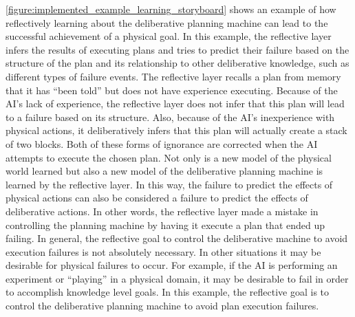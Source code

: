 {\mbox{\autoref{figure:implemented_example_learning_storyboard}}}
shows an example of how reflectively learning about the deliberative
planning machine can lead to the successful achievement of a physical
goal.  In this example, the reflective layer infers the results of
executing plans and tries to predict their failure based on the
structure of the plan and its relationship to other deliberative
knowledge, such as different types of failure events.  The reflective
layer recalls a plan from memory that it has ``been told'' but does
not have experience executing.  Because of the AI's lack of
experience, the reflective layer does not infer that this plan will
lead to a failure based on its structure.  Also, because of the AI's
inexperience with physical actions, it deliberatively infers that this
plan will actually create a stack of two blocks.  Both of these forms
of ignorance are corrected when the AI attempts to execute the chosen
plan.  Not only is a new model of the physical world learned but also
a new model of the deliberative planning machine is learned by the
reflective layer.  In this way, the failure to predict the effects of
physical actions can also be considered a failure to predict the
effects of deliberative actions.  In other words, the reflective layer
made a mistake in controlling the planning machine by having it
execute a plan that ended up failing.  In general, the reflective goal
to control the deliberative machine to avoid execution failures is not
absolutely necessary.  In other situations it may be desirable for
physical failures to occur.  For example, if the AI is performing an
experiment or ``playing'' in a physical domain, it may be desirable to
fail in order to accomplish knowledge level goals.  In this example,
the reflective goal is to control the deliberative planning machine to
avoid plan execution failures.
